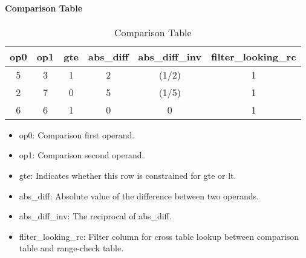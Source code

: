 \paragraph{Comparison Table} \label{sec:comparison-table}
\begin{table}[!ht]
    \centering
    \begin{tabular}{|c|c|c|c|c|c|}
        \hline
        \rowcolor{gray} op0 & op1 & gte & abs\_diff & abs\_diff\_inv & filter\_looking\_rc \\
        \hline
        5                   & 3   & 1   & 2         & (1/2)          & 1                   \\
        \hline
        2                   & 7   & 0   & 5         & (1/5)          & 1                   \\
        \hline
        6                   & 6   & 1   & 0         & 0              & 1                   \\
        \hline
    \end{tabular}
    \caption{Comparison Table}
    \label{table:comparison-table}
\end{table}
\begin{itemize}
    \item op0: Comparison first operand.
    \item op1: Comparison second operand.
    \item gte: Indicates whether this row is constrained for gte or lt.
    \item abs\_diff: Absolute value of the difference between two operands.
    \item abs\_diff\_inv: The reciprocal of abs\_diff.
    \item fliter\_looking\_rc: Filter column for cross table lookup between comparison table and range-check table.
\end{itemize}

